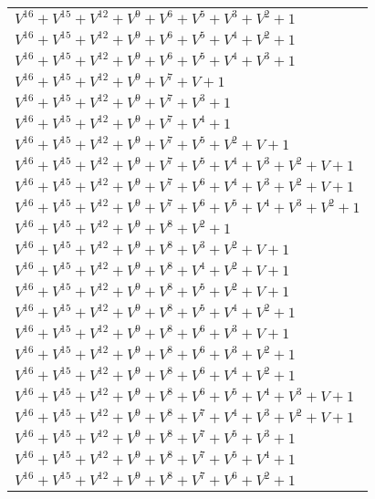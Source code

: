 \documentclass[12pt]{article}
\begin{document}
\begin{adjustwidth}{-4cm}{}
\begin{center}
\begin{longtable}{|l|}
$V^{16}  +V^{15}  +V^{12}  +V^{9}  +V^{6}  +V^{5}  +V^{3}  +V^{2}  + 1$ \\
$V^{16}  +V^{15}  +V^{12}  +V^{9}  +V^{6}  +V^{5}  +V^{4}  +V^{2}  + 1$ \\
$V^{16}  +V^{15}  +V^{12}  +V^{9}  +V^{6}  +V^{5}  +V^{4}  +V^{3}  + 1$ \\
$V^{16}  +V^{15}  +V^{12}  +V^{9}  +V^{7}  + V + 1$ \\
$V^{16}  +V^{15}  +V^{12}  +V^{9}  +V^{7}  +V^{3}  + 1$ \\
$V^{16}  +V^{15}  +V^{12}  +V^{9}  +V^{7}  +V^{4}  + 1$ \\
$V^{16}  +V^{15}  +V^{12}  +V^{9}  +V^{7}  +V^{5}  +V^{2}  + V + 1$ \\
$V^{16}  +V^{15}  +V^{12}  +V^{9}  +V^{7}  +V^{5}  +V^{4}  +V^{3}  +V^{2}  + V + 1$ \\
$V^{16}  +V^{15}  +V^{12}  +V^{9}  +V^{7}  +V^{6}  +V^{4}  +V^{3}  +V^{2}  + V + 1$ \\
$V^{16}  +V^{15}  +V^{12}  +V^{9}  +V^{7}  +V^{6}  +V^{5}  +V^{4}  +V^{3}  +V^{2}  + 1$ \\
$V^{16}  +V^{15}  +V^{12}  +V^{9}  +V^{8}  +V^{2}  + 1$ \\
$V^{16}  +V^{15}  +V^{12}  +V^{9}  +V^{8}  +V^{3}  +V^{2}  + V + 1$ \\
$V^{16}  +V^{15}  +V^{12}  +V^{9}  +V^{8}  +V^{4}  +V^{2}  + V + 1$ \\
$V^{16}  +V^{15}  +V^{12}  +V^{9}  +V^{8}  +V^{5}  +V^{2}  + V + 1$ \\
$V^{16}  +V^{15}  +V^{12}  +V^{9}  +V^{8}  +V^{5}  +V^{4}  +V^{2}  + 1$ \\
$V^{16}  +V^{15}  +V^{12}  +V^{9}  +V^{8}  +V^{6}  +V^{3}  + V + 1$ \\
$V^{16}  +V^{15}  +V^{12}  +V^{9}  +V^{8}  +V^{6}  +V^{3}  +V^{2}  + 1$ \\
$V^{16}  +V^{15}  +V^{12}  +V^{9}  +V^{8}  +V^{6}  +V^{4}  +V^{2}  + 1$ \\
$V^{16}  +V^{15}  +V^{12}  +V^{9}  +V^{8}  +V^{6}  +V^{5}  +V^{4}  +V^{3}  + V + 1$ \\
$V^{16}  +V^{15}  +V^{12}  +V^{9}  +V^{8}  +V^{7}  +V^{4}  +V^{3}  +V^{2}  + V + 1$ \\
$V^{16}  +V^{15}  +V^{12}  +V^{9}  +V^{8}  +V^{7}  +V^{5}  +V^{3}  + 1$ \\
$V^{16}  +V^{15}  +V^{12}  +V^{9}  +V^{8}  +V^{7}  +V^{5}  +V^{4}  + 1$ \\
$V^{16}  +V^{15}  +V^{12}  +V^{9}  +V^{8}  +V^{7}  +V^{6}  +V^{2}  + 1$ \\

\end{longtable}
\end{center}
\end{adjustwidth}
\end{document}
